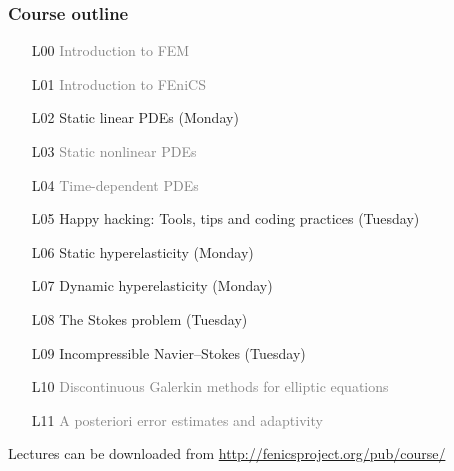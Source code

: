 \documentclass{fenicscourse}
\begin{document}

\begin{frame}
  \frametitle{Course outline}



  \small

  \begin{enumerate}
  \item[L00]
    \textcolor{grey}{Introduction to FEM}
  \item[L01]
    \textcolor{grey}{Introduction to FEniCS}
  \item[L02]
    Static linear PDEs (Monday)
  \item[L03]
    \textcolor{grey}{Static nonlinear PDEs}
  \item[L04]
    \textcolor{grey}{Time-dependent PDEs}
  \item[L05]
    Happy hacking: Tools, tips and coding practices (Tuesday)
  \item[L06]
    Static hyperelasticity (Monday)
  \item[L07]
    Dynamic hyperelasticity (Monday)
  \item[L08]
    The Stokes problem (Tuesday)
  \item[L09]
    Incompressible Navier--Stokes (Tuesday)
  \item[L10]
    \textcolor{grey}{Discontinuous Galerkin methods for elliptic equations}
  \item[L11]
    \textcolor{grey}{A posteriori error estimates and adaptivity}
  \end{enumerate}

  \normalsize

  {\footnotesize Lectures can be downloaded from
    \url{http://fenicsproject.org/pub/course/}}
\end{frame}
\end{document}
